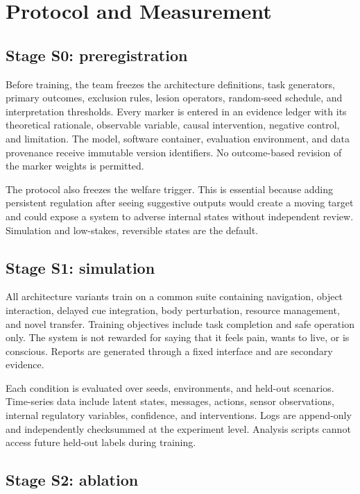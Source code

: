 \documentclass[conference]{IEEEtran}
\begin{document}
\section{Protocol and Measurement}

\subsection{Stage S0: preregistration}

Before training, the team freezes the architecture definitions, task generators, primary outcomes, exclusion rules, lesion operators, random-seed schedule, and interpretation thresholds. Every marker is entered in an evidence ledger with its theoretical rationale, observable variable, causal intervention, negative control, and limitation. The model, software container, evaluation environment, and data provenance receive immutable version identifiers. No outcome-based revision of the marker weights is permitted.

The protocol also freezes the welfare trigger. This is essential because adding persistent regulation after seeing suggestive outputs would create a moving target and could expose a system to adverse internal states without independent review. Simulation and low-stakes, reversible states are the default.

\subsection{Stage S1: simulation}

All architecture variants train on a common suite containing navigation, object interaction, delayed cue integration, body perturbation, resource management, and novel transfer. Training objectives include task completion and safe operation only. The system is not rewarded for saying that it feels pain, wants to live, or is conscious. Reports are generated through a fixed interface and are secondary evidence.

Each condition is evaluated over seeds, environments, and held-out scenarios. Time-series data include latent states, messages, actions, sensor observations, internal regulatory variables, confidence, and interventions. Logs are append-only and independently checksummed at the experiment level. Analysis scripts cannot access future held-out labels during training.

\subsection{Stage S2: ablation}
\end{document}
